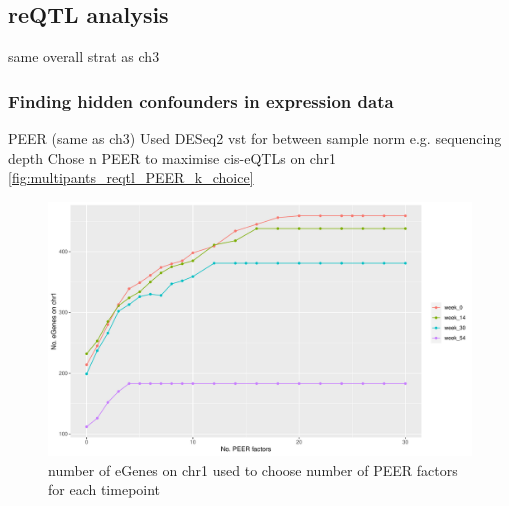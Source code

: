 \begin{outline}
\subsection{reQTL analysis}

\1 same overall strat as ch3





\subsubsection{Finding hidden confounders in expression data}

\1 PEER (same as ch3)
    \2 Used DESeq2 vst for between sample norm e.g. sequencing depth 
    \2 Chose n PEER to maximise cis-eQTLs on chr1 \autoref{fig:multipants_reqtl_PEER_k_choice} 

\begin{figure}
    \centering
    \includegraphics[width=1.0\textwidth,page=1]{mainmatter/figures/chapter_04/count_eGenes.signif_eGenes_vs_PEER_n.dataset_multiPANTS.chr_1.pdf}
    \caption{number of eGenes on chr1 used to choose number of PEER factors for each timepoint}
    \label{fig:multipants_reqtl_PEER_k_choice}
\end{figure}


\end{outline}
